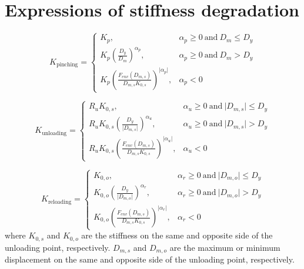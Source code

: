 \documentclass[12pt]{article}
\begin{document}
%
\section{Expressions of stiffness degradation}
\begin{equation}
K_{\mathrm{pinching}} = \begin{cases}
K_{p}, & \alpha_p \geq 0 \ \mathrm{and} \ D_m \leq D_y \\ 
K_{p}\left(\frac{D_y}{D_m}\right)^{\alpha_p}, & \alpha_p \geq 0 \ \mathrm{and} \ D_m > D_y \\ 
K_{p}\left(\frac{F_{env}(D_{m,s})}{D_{m,s}K_{0,s}}\right)^{\lvert\alpha_p\rvert}, & \alpha_p < 0
\end{cases}
\end{equation}

\begin{equation}
K_{\mathrm{unloading}} = \begin{cases}
R_uK_{0,s}, & \alpha_u \geq 0 \ \mathrm{and} \ \lvert D_{m,s}\rvert \leq D_y \\
R_uK_{0,s} \left(\frac{D_y}{\lvert D_{m,s}\rvert}\right)^{\alpha_u}, & \alpha_u \geq 0 \ \mathrm{and} \ \lvert D_{m,s}\rvert > D_y \\
R_uK_{0,s} \left(\frac{F_{env}(D_{m,s})}{D_{m,s}K_{0,s}}\right)^{\lvert\alpha_u\rvert}, & \alpha_u < 0
\end{cases}
\end{equation}

\begin{equation}
K_{\mathrm{reloading}} = \begin{cases}
K_{0,o}, & \alpha_r \geq 0 \ \mathrm{and} \ \lvert D_{m,o}\rvert \leq D_y \\
K_{0,o} \left(\frac{D_y}{\lvert D_{m,o}\rvert}\right)^{\alpha_r}, & \alpha_r \geq 0 \ \mathrm{and} \ \lvert D_{m,o}\rvert > D_y \\
K_{0,o} \left(\frac{F_{env}(D_{m,s})}{D_{m,s}K_{0,s}}\right)^{\lvert\alpha_r\rvert}, & \alpha_r < 0
\end{cases}
\end{equation}
where $K_{0,s}$ and $K_{0,o}$ are the stiffness on the same and opposite side of the unloading point, respectively. $D_{m,s}$ and $D_{m,o}$ are the maximum or minimum displacement on the same and opposite side of the unloading point, respectively. 
\end{document}
